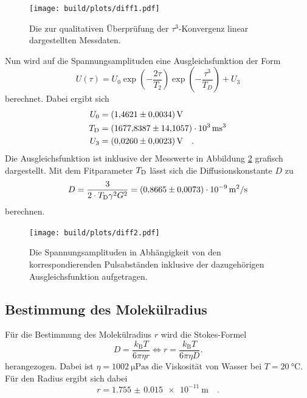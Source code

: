\begin{figure}[H]
  \centering
  \texttt{[image: build/plots/diff1.pdf]}
  \caption{Die zur qualitativen Überprüfung der $\tau^3$-Konvergenz linear dargestellten Messdaten. }
\label{img:diff1}
\end{figure}


\noindent 
Nun wird auf die Spannungsamplituden eine Ausgleichsfunktion der Form 
\begin{equation*}
  U\left(\tau\right) = U_0 \exp{\left(-\frac{2\tau}{T_2}\right)} \exp{\left(-\frac{\tau^3}{T_D}\right)} + U_3
\end{equation*}
berechnet. Dabei ergibt sich
\begin{align*}
  U_0 &= \SI{1.4621(34)}{\volt}\\
  T_\t{D} &= \SI{1677.8387(141057)e3}{\milli\second^3}\\
  U_3 &= \SI{0.0260(23)}{\volt} \quad .
\end{align*}
Die Ausgleichsfunktion ist inklusive der Messwerte in Abbildung \ref{img:diff2} grafisch dargestellt.
Mit dem Fitparameter $T_\t{D}$ lässt sich die Diffusionskonstante $D$ zu 
\begin{equation*}
  D = \frac{3}{2\cdot T_\t{D} \gamma^2 G^2} = \SI{0.8665(73)e-9}{\metre^2\per\second}
\end{equation*}
berechnen. 


\begin{figure}[H]
  \centering
  \texttt{[image: build/plots/diff2.pdf]}
  \caption{Die Spannungsamplituden in Abhängigkeit von den korrespondierenden Pulsabständen inklusive der dazugehörigen Ausgleichsfunktion aufgetragen. }
\label{img:diff2}
\end{figure}



\subsection{Bestimmung des Molekülradius}


\noindent
Für die Bestimmung des Molekülradius $r$ wird die Stokes-Formel 
\begin{equation*}
  D = \frac{k_\text{B}T}{6\pi\eta r} \iff r = \frac{k_\text{B}T}{6 \pi\eta D}.
\end{equation*}
herangezogen. Dabei ist $\eta = \SI{1002}{\micro\pascal\second} $\cite{visko} die Viskosität von Wasser bei $T= \SI{20}{\degreeCelsius}$.
Für den Radius ergibt sich dabei 
\begin{equation*}
  r = \SI{1.755(15)e-11}{\metre} \quad .
\end{equation*}

